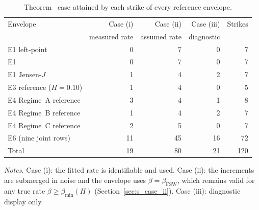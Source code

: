\begin{table}[!htb]
\centering
\caption{Theorem~ case attained by each strike of every reference \RCBridge{} envelope.}
\label{tab:s_case_counts}
\footnotesize
\begin{tabular}{@{}lrrrr@{}}
\toprule
Envelope & Case (i) & Case (ii) & Case (iii) & Strikes \\
 & measured rate & assumed rate & diagnostic & \\
\midrule
E1 left-point & 0 & 7 & 0 & 7 \\
E1 \RCCE{} & 0 & 7 & 0 & 7 \\
E1 Jensen-$J$ & 1 & 4 & 2 & 7 \\
E3 reference ($H=0.10$) & 1 & 4 & 0 & 5 \\
E4 Regime~A reference & 3 & 4 & 1 & 8 \\
E4 Regime~B reference & 1 & 4 & 2 & 7 \\
E4 Regime~C reference & 2 & 5 & 0 & 7 \\
E6 (nine joint rows) & 11 & 45 & 16 & 72 \\
\midrule
Total & 19 & 80 & 21 & 120 \\
\bottomrule
\end{tabular}
\par\smallskip
\parbox{\linewidth}{\footnotesize\emph{Notes.} Case (i): the fitted rate is identifiable and used. Case (ii): the increments are submerged in noise and the envelope uses $\beta=\beta_{\mathrm{FSW}}$, which remains valid for any true rate $\beta\ge\beta_{\min}(H)$ (Section~\ref{sec:s_case_ii}). Case (iii): diagnostic display only.}
\end{table}
